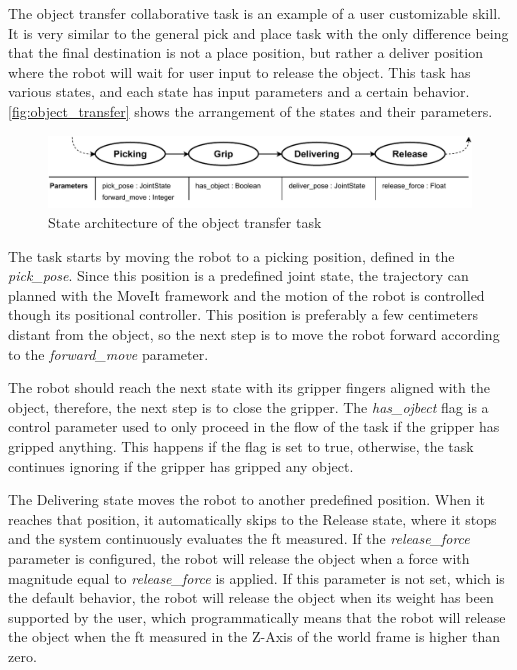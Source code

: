 \par The object transfer collaborative task is an example of a user customizable skill. It is very similar to the general pick and place task with the only difference being that the final destination is not a place position, but rather a deliver position where the robot will wait for user input to release the object. This task has various states, and each state has input parameters and a certain behavior. \autoref{fig:object_transfer} shows the arrangement of the states and their parameters.

\begin{figure}[h]
    \centering
    \includegraphics[width=\linewidth]{figs/chp5/pick_and_deliver.pdf}
    \caption{State architecture of the object transfer task}
    \label{fig:object_transfer}
\end{figure}

\par The task starts by moving the robot to a picking position, defined in the \textit{pick\_pose}. Since this position is a predefined joint state, the trajectory can planned with the MoveIt framework and the motion of the robot is controlled though its positional controller. This position is preferably a few centimeters distant from the object, so the next step is to move the robot forward according to the \textit{forward\_move} parameter.
\par The robot should reach the next state with its gripper fingers aligned with the object, therefore, the next step is to close the gripper. The \textit{has\_ojbect} flag is a control parameter used to only proceed in the flow of the task if the gripper has gripped anything. This happens if the flag is set to true, otherwise, the task continues ignoring if the gripper has gripped any object.
\par The Delivering state moves the robot to another predefined position. When it reaches that position, it automatically skips to the Release state, where it stops and the system continuously evaluates the \ac{ft} measured. If the \textit{release\_force} parameter is configured, the robot will release the object when a force with magnitude equal to \textit{release\_force} is applied. If this parameter is not set, which is the default behavior, the robot will release the object when its weight has been supported by the user, which programmatically means that the robot will release the object when the \ac{ft} measured in the Z-Axis of the world frame is higher than zero. 

